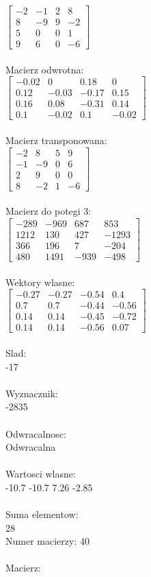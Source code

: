 \documentclass[a4paper,12pt]{article}
\begin{document}
$\begin{bmatrix} -2&-1&2&8\\8&-9&9&-2\\5&0&0&1\\9&6&0&-6 \end{bmatrix}$
\\
\\
Macierz odwrotna:\\

$\begin{bmatrix} -0.02&0&0.18&0\\0.12&-0.03&-0.17&0.15\\0.16&0.08&-0.31&0.14\\0.1&-0.02&0.1&-0.02 \end{bmatrix}$
\\
\\
Macierz transponowana:\\

$\begin{bmatrix} -2&8&5&9\\-1&-9&0&6\\2&9&0&0\\8&-2&1&-6 \end{bmatrix}$
\\
\\
Macierz do potegi 3:\\

$\begin{bmatrix} -289&-969&687&853\\1212&130&427&-1293\\366&196&7&-204\\480&1491&-939&-498 \end{bmatrix}$
\\
\\
Wektory wlasne:\\

$\begin{bmatrix} -0.27&-0.27&-0.54&0.4\\0.7&0.7&-0.44&-0.56\\0.14&0.14&-0.45&-0.72\\0.14&0.14&-0.56&0.07 \end{bmatrix}$
\\
\\
Slad:\\
-17
\\
\\
Wyznacznik:\\
-2835
\\
\\
Odwracalnosc:\\
Odwracalna
\\
\\
Wartosci wlasne:\\
-10.7 -10.7 7.26 -2.85
\\
\\
Suma elementow:\\
28
\\
\newpage
Numer macierzy:
40
\\
\\
Macierz:\\
\end{document}
